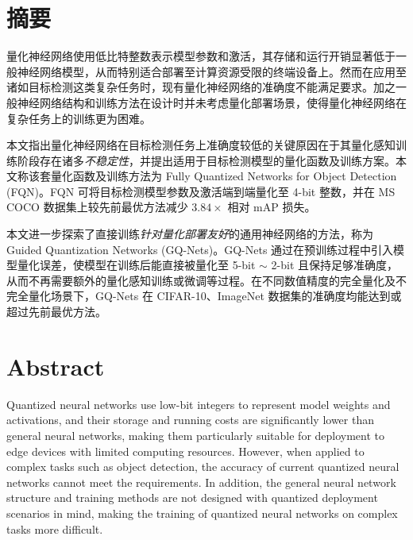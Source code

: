 \maketitle%
\MAKETITLE%
\makedeclaration%
\intobmk\chapter*{摘\quad 要}%
\setcounter{page}{1}%
量化神经网络使用低比特整数表示模型参数和激活，其存储和运行开销显著低于一般神经网络模型，从而特别适合部署至计算资源受限的终端设备上。然而在应用至诸如目标检测这类复杂任务时，现有量化神经网络的准确度不能满足要求。加之一般神经网络结构和训练方法在设计时并未考虑量化部署场景，使得量化神经网络在复杂任务上的训练更为困难。

本文指出量化神经网络在目标检测任务上准确度较低的关键原因在于其量化感知训练阶段存在诸多\emph{不稳定性}，并提出适用于目标检测模型的量化函数及训练方案。本文称该套量化函数及训练方法为 Fully Quantized Networks for Object Detection (FQN)。FQN 可将目标检测模型参数及激活端到端量化至 4-bit 整数，并在 MS COCO 数据集上较先前最优方法减少 $3.84\times$ 相对 mAP 损失。

本文进一步探索了直接训练\emph{针对量化部署友好}的通用神经网络的方法，称为 Guided Quantization Networks (GQ-Nets)。GQ-Nets 通过在预训练过程中引入模型量化误差，使模型在训练后能直接被量化至 5-bit $\sim$ 2-bit 且保持足够准确度，从而不再需要额外的量化感知训练或微调等过程。在不同数值精度的完全量化及不完全量化场景下，GQ-Nets 在 CIFAR-10、ImageNet 数据集的准确度均能达到或超过先前最优方法。

\intobmk\chapter*{Abstract}%
Quantized neural networks use low-bit integers to represent model weights and activations, and their storage and running costs are significantly lower than general neural networks, making them particularly suitable for deployment to edge devices with limited computing resources. However, when applied to complex tasks such as object detection, the accuracy of current quantized neural networks cannot meet the requirements. In addition, the general neural network structure and training methods are not designed with quantized deployment scenarios in mind, making the training of quantized neural networks on complex tasks more difficult.

